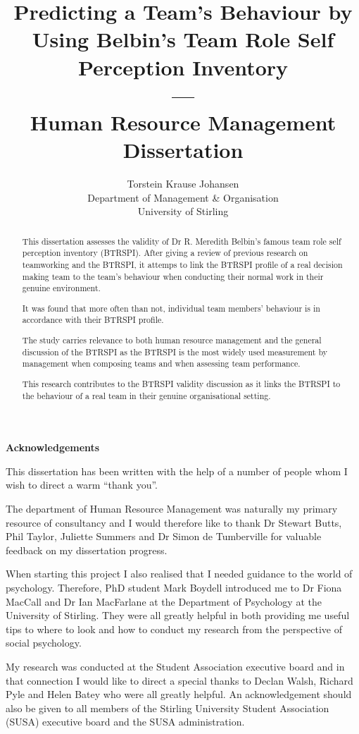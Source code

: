 \documentclass[a4paper,12pt,titlepage]{report}
\title{Predicting a Team's Behaviour by Using Belbin's Team Role Self Perception Inventory  \\ --- \\Human Resource Management \\ Dissertation}
\author{Torstein Krause Johansen \\ Department of Management \& Organisation \\ University of Stirling}
\begin{document}
  \setlength{\baselineskip}{2em}
  \maketitle

  \begin{center}
    \bf{Acknowledgements}
  \end{center}
  This dissertation has been written with the help of a number
  of people whom I wish to direct a warm ``thank you''.

  The department of Human Resource Management was naturally my
  primary resource of consultancy and I would therefore
  like to thank Dr Stewart Butts,
  Phil Taylor, Juliette Summers and Dr Simon de Tumberville for valuable
  feedback on my dissertation progress.

  When starting this project I also realised that I needed guidance
  to the world of psychology. Therefore, PhD student Mark Boydell
  introduced me to Dr Fiona MacCall and Dr Ian MacFarlane at the Department
  of Psychology at the University of Stirling. They were all greatly
  helpful in both providing me useful tips to where to look and 
  how to conduct my research from the perspective of social psychology.

  My research was conducted at the Student Association executive board
  and in that connection I would like to direct a special thanks
  to Declan Walsh, Richard Pyle and Helen Batey who were all
  greatly helpful. An acknowledgement should also be given to
  all members of the Stirling University Student Association (SUSA)
  executive board and the SUSA administration.

  \begin{abstract}
    This dissertation assesses the validity of Dr R. Meredith Belbin's
    famous team role self perception inventory (BTRSPI). After giving
    a review of previous research on teamworking and the BTRSPI, it
    attemps to link the BTRSPI profile of a real decision making team
    to the team's behaviour when conducting their normal work in
    their genuine environment.

    It was found that more often than not, 
    individual team members' behaviour is in accordance with their
    BTRSPI profile.

    The study carries relevance to both human resource management and
    the general discussion of the BTRSPI as the BTRSPI is the most widely
    used measurement by management when composing teams and when
    assessing team performance.

    This research contributes to the BTRSPI validity discussion as it links
    the BTRSPI to the behaviour of a real team in their genuine organisational
    setting.
  \end{abstract}
\end{document}
